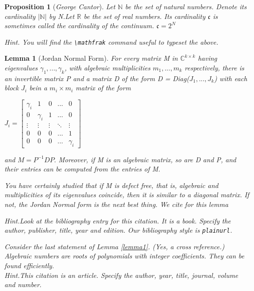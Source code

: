 \documentclass{article}
\begin{document}
\newtheorem{proposition}{Proposition}[section]

\begin{proposition}[\emph{George Cantor}]
Let $\mathbb{N}$ be the set of natural numbers. Denote its cardinality $\vert \mathbb{N} \vert$  by N.Let $\mathbb{R}$ be the set of real numbers. Its cardinality $\mathfrak{c}$ is sometimes called the cardinality of the continuum.  $\mathfrak{c} = 2^{N}$ \par
Hint. \emph{You will find the} \verb!\mathfrak! \emph{command useful to typeset the above.}
\end{proposition}

\newtheorem{lemma}{Lemma}\label{lemma1}

\begin{lemma}[Jordan Normal Form]
For every matrix M in $\mathbb{C}^{k \times k}$ having eigenvalues $\gamma_{1},...,\gamma_{k}$, with algebraic multiplicities $m_{1},...,m_{k}$ respectively, there is an invertible matrix \emph{P} and a matrix \emph{D} of the form \emph{D} = Diag\emph{(}$J_1,...,J_k$\emph{)} with each block $J_i$ bein a $m_i \times m_i$ matrix of the form \par

$J_i = \begin{bmatrix} 
\gamma_i & 1 & 0 & ... & 0 \\
0 &\gamma_i & 1 & ... & 0 \\
\vdots &\vdots & \vdots & \ddots & \vdots \\
0 & 0 & 0 & ... & 1 \\
0 & 0 & 0 & ... & \gamma_i
\end{bmatrix}$
\centering \par
\vspace{0.5em}
\raggedright
and $M = P^{-1}DP.$ Moreover, if M is an algebraic matrix, so are D and P, and
their entries can be computed from the entries of M. \par
\emph{You have certainly studied that if M is defect free, that is, algebraic and multiplicities of its eigenvalues coincide, then it is similar to a diagonal matrix.
If not, the Jordan Normal form is the next best thing. We cite \cite{textbook1} for this lemma}\par
Hint.\emph{Look at the bibliography entry for this citation. It is a book. Specify the author, publisher, title, year and edition. Our bibliography style is} \verb!plainurl!. \par
\emph{Consider the last statement of Lemma  \ref{lemma1}. (Yes, a cross reference.)
Algebraic numbers are roots of polynomials with integer coefficients. They can be found efficiently. \cite{textbook2}}\\
Hint.\emph{This citation is an article. Specify the author, year, title,
journal, volume and number.}

\end{lemma}
\end{document}
